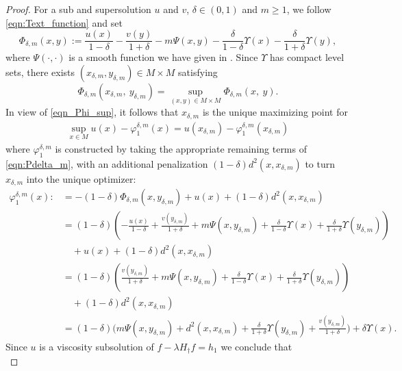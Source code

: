 \documentclass[a4paper]{article}
\numberwithin{equation}{section}
\theoremstyle{definition}
\begin{document}
\begin{proof} 
    For a sub and supersolution $u$ and $v$, $\delta \in (0,1)$ and $m \geq 1$, we follow \eqref{eqn:Text_function} and set
 \begin{equation}\label{eqn:Pdelta_m}
\Phi_{\delta,m}(x,y):=\frac{u(x)}{1-\delta}-\frac{v(y)}{1+\delta}-m\Psi(x,y)-\frac{\delta}{1-\delta}\Upsilon(x)-\frac{\delta}{1+\delta}\Upsilon(y),
\end{equation}
where $\Psi(\cdot,\cdot)$ is a smooth function we have given in . Since $\Upsilon$ has compact level sets, there exists $(x_{\delta,m},y_{\delta,m})\in M\times M$ satisfying 
\begin{equation}\label{eqn_Phi_sup}
\Phi_{\delta,m}(x_{\delta,m},~y_{\delta,m})=\sup_{(x,y)\in M\times M}\Phi_{\delta,m}(x,~y).
\end{equation}
In view of \eqref{eqn_Phi_sup}, it follows that $x_{\delta,m}$ is the unique maximizing point for
\begin{align*}
\sup_{x\in M}u(x)-\varphi_1^{\delta,m}(x)=u(x_{\delta,m})-\varphi_1^{\delta,m}(x_{\delta,m})
\end{align*}
where $\varphi_1^{\delta,m}$ is constructed by taking the appropriate remaining terms of \eqref{eqn:Pdelta_m}, with an additional penalization $(1-\delta)d^2(x,x_{\delta,m})$ to turn $x_{\delta,m}$ into the unique optimizer:
\begin{align*}%
\varphi_1^{\delta,m}(x):&=-(1-\delta)\Phi_{\delta,m}(x,y_{\delta,m})+u(x)+(1-\delta)d^2(x,x_{\delta,m})\\
&=(1-\delta)\left(-\frac{u(x)}{1-\delta}+\frac{v(y_{\delta,m})}{1+\delta}+m\Psi(x,y_{\delta,m})+\frac{\delta}{1-\delta}\Upsilon(x)+\frac{\delta}{1+\delta}\Upsilon(y_{\delta,m})\right)\\
&\quad+u(x)+(1-\delta)d^2(x,x_{\delta,m})\\
&=(1-\delta)\left(\frac{v(y_{\delta,m})}{1+\delta}+m\Psi(x,y_{\delta,m})+\frac{\delta}{1-\delta}\Upsilon(x)+\frac{\delta}{1+\delta}\Upsilon(y_{\delta,m})\right)\\
&\quad+(1-\delta)d^2(x,x_{\delta,m})\\
&=(1-\delta)\bigg(m\Psi(x,y_{\delta,m})+d^2(x,x_{\delta,m})+\frac{\delta}{1+\delta}\Upsilon(y_{\delta,m})+\frac{v(y_{\delta,m})}{1+\delta}\bigg)+\delta\Upsilon(x).
\end{align*}
Since $u$ is a viscosity subsolution of $f-\lambda H_{\dagger}f=h_1$ we conclude that
\begin{equation}\label{eqn_sub_inequality}

\end{equation}
\end{proof}
\end{document}

